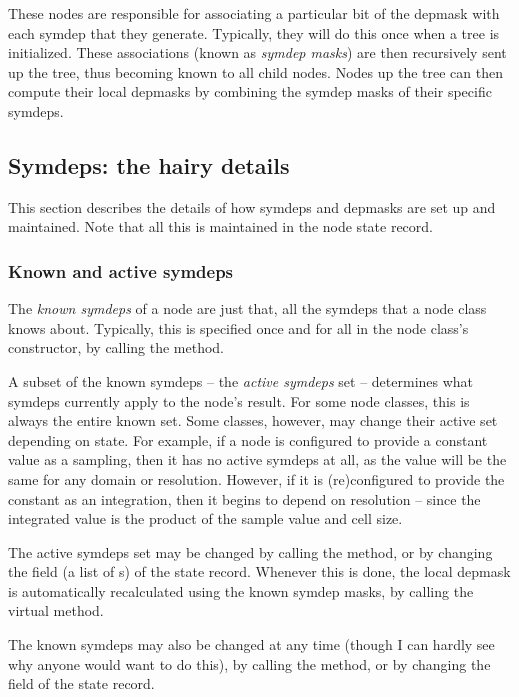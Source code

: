 \documentclass[10pt]{article}
\begin{document}
  These nodes are responsible for associating a particular bit of the depmask
  with each symdep that they generate. Typically, they will do this once when a
  tree is initialized. These associations (known as {\em symdep masks}) are
  then recursively sent up the tree, thus becoming known to all child nodes.
  Nodes up the tree can then compute their local depmasks by combining the
  symdep masks of their specific symdeps.

\subsection{Symdeps: the hairy details}

  This section describes the details of how symdeps and depmasks are set up and
  maintained. Note that all this is maintained in the node state record.

\subsubsection{Known and active symdeps} 
  
  The {\em known symdeps} of a node are just that, all the symdeps that a node
  class knows about. Typically, this is specified once and for all in the
  node class's constructor, by calling the  method.
  
  A subset of the known symdeps -- the {\em active symdeps} set -- determines
  what symdeps currently apply to the node's result. For some node classes,
  this is always the entire known set. Some classes, however, may change their
  active set depending on state. For example, if a  node is
  configured to provide a constant value as a sampling, then it has no active
  symdeps at all, as the value will be the same for any domain or resolution.
  However, if it is (re)configured to provide the constant as an integration,
  then it begins to depend on resolution -- since the integrated value is the
  product of the sample value and cell size.

  The active symdeps set may be changed by calling the 
  method, or by changing the  field (a list of s)
  of the state record. Whenever this is done, the local depmask is
  automatically recalculated using the known symdep masks, by calling the
  virtual  method.

  The known symdeps may also be changed at any time (though I can hardly see
  why anyone would want to do this), by calling the 
  method, or by changing the   field of the state record. 
  
\end{document}
